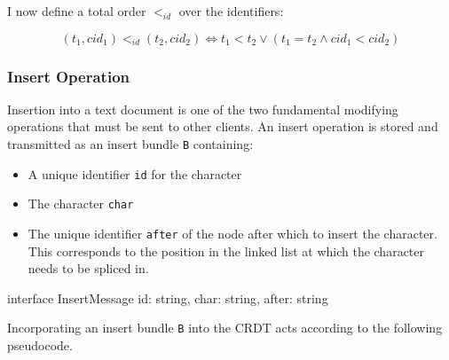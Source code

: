 \documentclass[12pt,a4paper,twoside,openright]{report}
\begin{document}
		
		I now define a total order $<_{id}$ over the identifiers:
		
		\[(t_1, cid_1) <_{id} (t_2, cid_2) \Leftrightarrow t_1 < t_2 \lor (t_1 = t_2 \land cid_1 < cid_2)\]
		
		
		\subsubsection{Insert Operation}
			Insertion into a text document is one of the two fundamental modifying operations that must be sent to other clients. An insert operation is stored and transmitted as an insert bundle \texttt{B} containing: 
			\begin{itemize}
				\item A unique identifier \texttt{id} for the character
				\item The character \texttt{char}
				\item The unique identifier \texttt{after} of the node after which to insert the character. This corresponds to the position in the linked list at which the character needs to be spliced in.
			\end{itemize}
			
\vspace{3mm}	
\begin{typescript}
interface InsertMessage {
    id: string,
    char: string,
    after: string
}
\end{typescript}
				
				Incorporating an insert bundle \texttt{B} into the CRDT acts according to the following pseudocode.
				
\end{document}
